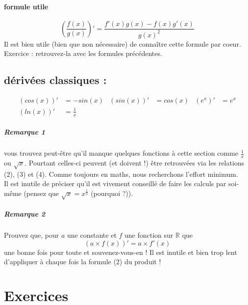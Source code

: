\documentclass[11pt]{article}
\newcommand{\R}{\mathbb R}
\newcommand{\de}[1]{\left(#1\right)'}
\begin{document}
        \paragraph{formule utile}
        \begin{equation*}
            (\frac{f(x)}{g(x)})' = \frac{f'(x)g(x) - f(x)g'(x)}{g(x)^2}
        \end{equation*}
        Il est bien utile (bien que non nécessaire) de connaître cette formule par coeur.\\
        Exercice : retrouvez-la avec les formules précédentes.
        \subsection{dérivées classiques :}
        \begin{align*}
            \de{cos(x)} &= -sin(x) &\de{sin(x)} &= cos(x) & \de{e^x} &= e^x \\
            \de{ln(x)} &= \frac{1}{x} 
        \end{align*}
        \subparagraph{Remarque 1} vous trouvez peut-être qu'il manque quelques fonctions à cette section comme $\frac{1}{x}$ ou $\sqrt{x}$. Pourtant celles-ci peuvent (et doivent !) être retrouvées via les relations (2), (3) et (4). Comme toujours en maths, nous recherchons l'effort minimum.\\
        Il est inutile de préciser qu'il est vivement conseillé de faire les calculs par soi-même (pensez que $\sqrt{x} = x^{\frac{1}{2}}$ (pourquoi ?)).
        \subparagraph{Remarque 2} Prouvez que, pour $a$ une constante et $f$ une fonction sur $\R$ que
        \begin{equation*}
         \de{a\times f(x)} = a\times f'(x) 
        \end{equation*}
         une bonne fois pour toute et souvenez-vous-en ! Il est inutile et bien trop lent d'appliquer à chaque fois la formule (2) du produit !  

    \section{Exercices}
\end{document}
